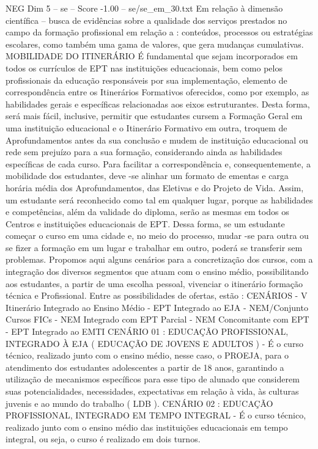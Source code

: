 \begin{textsample}{NEG Dim 5 – se – Score -1.00 – se/se\_em\_30.txt}
Em relação à dimensão científica – busca de evidências sobre a qualidade dos serviços prestados no campo da formação profissional em relação a : conteúdos, processos ou estratégias escolares, como também uma gama de valores, que gera mudanças cumulativas.
MOBILIDADE DO ITINERÁRIO É fundamental que sejam incorporados em todos os currículos de EPT nas instituições educacionais, bem como pelos profissionais da educação responsáveis por sua implementação, elemento de correspondência entre os Itinerários Formativos oferecidos, como por exemplo, as habilidades gerais e específicas relacionadas aos eixos estruturantes.
Desta forma, será mais fácil, inclusive, permitir que estudantes cursem a Formação Geral em uma instituição educacional e o Itinerário Formativo em outra, troquem de Aprofundamentos antes da sua conclusão e mudem de instituição educacional ou rede sem prejuízo para a sua formação, considerando ainda as habilidades específicas de cada curso.
Para facilitar a correspondência e, consequentemente, a mobilidade dos estudantes, deve -se alinhar um formato de ementas e carga horária média dos Aprofundamentos, das Eletivas e do Projeto de Vida.
Assim, um estudante será reconhecido como tal em qualquer lugar, porque as habilidades e competências, além da validade do diploma, serão as mesmas em todos os Centros e instituições educacionais de EPT.
Dessa forma, se um estudante começar o curso em uma cidade e, no meio do processo, mudar -se para outra ou se fizer a formação em um lugar e trabalhar em outro, poderá se transferir sem problemas.
Propomos aqui alguns cenários para a concretização dos cursos, com a integração dos diversos segmentos que atuam com o ensino médio, possibilitando aos estudantes, a partir de uma escolha pessoal, vivenciar o itinerário formação técnica e Profissional.
Entre as possibilidades de ofertas, estão : CENÁRIOS - V Itinerário Integrado ao Ensino Médio - EPT Integrado ao EJA - NEM/Conjunto Cursos FICs - NEM Integrado com EPT Parcial - NEM Concomitante com EPT - EPT Integrado ao EMTI CENÁRIO 01 : EDUCAÇÃO PROFISSIONAL, INTEGRADO À EJA ( EDUCAÇÃO DE JOVENS E ADULTOS ) - É o curso técnico, realizado junto com o ensino médio, nesse caso, o PROEJA, para o atendimento dos estudantes adolescentes a partir de 18 anos, garantindo a utilização de mecanismos específicos para esse tipo de alunado que considerem suas potencialidades, necessidades, expectativas em relação à vida, às culturas juvenis e ao mundo do trabalho ( LDB ).
CENÁRIO 02 : EDUCAÇÃO PROFISSIONAL, INTEGRADO EM TEMPO INTEGRAL - É o curso técnico, realizado junto com o ensino médio das instituições educacionais em tempo integral, ou seja, o curso é realizado em dois turnos.

\end{textsample}
